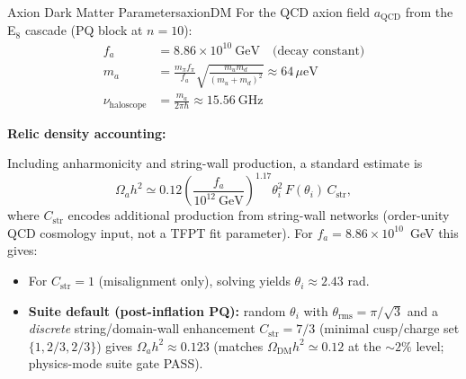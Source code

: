 \begin{theorem}{Axion Dark Matter Parameters}{axionDM}
For the QCD axion field $a_{\text{QCD}}$ from the E$_8$ cascade (PQ block at $n = 10$):
\begin{align}
    f_a &= 8.86 \times 10^{10}~\text{GeV} \quad \text{(decay constant)}\\
    m_a &= \frac{m_\pi f_\pi}{f_a}\sqrt{\frac{m_u m_d}{(m_u + m_d)^2}} \approx 64\,\mu\text{eV}\\
    \nu_{\text{haloscope}} &= \frac{m_a}{2\pi\hbar} \approx 15.56~\text{GHz}
\end{align}
\end{theorem}

\textbf{Relic density accounting:}

Including anharmonicity and string-wall production, a standard estimate is
\begin{equation}
    \Omega_a h^2 \simeq 0.12\left(\frac{f_a}{10^{12}~\text{GeV}}\right)^{1.17}\theta_i^2\,F(\theta_i)\,C_{\mathrm{str}},
\end{equation}
where $C_{\mathrm{str}}$ encodes additional production from string-wall networks (order-unity QCD cosmology input, not a TFPT fit parameter).
For $f_a = 8.86 \times 10^{10}$~GeV this gives:
\begin{itemize}[leftmargin=1.5em, topsep=2pt, itemsep=1pt]
    \item For $C_{\mathrm{str}}=1$ (misalignment only), solving yields $\theta_i \approx 2.43$ rad.
    \item \textbf{Suite default (post-inflation PQ):} random $\theta_i$ with $\theta_{\mathrm{rms}}=\pi/\sqrt{3}$ and a \emph{discrete} string/domain-wall enhancement $C_{\mathrm{str}}=7/3$ (minimal cusp/charge set $\{1,2/3,2/3\}$) gives $\Omega_a h^2 \approx 0.123$ (matches $\Omega_{\mathrm{DM}}h^2\simeq 0.12$ at the $\sim 2\%$ level; physics-mode suite gate PASS).
\end{itemize}

